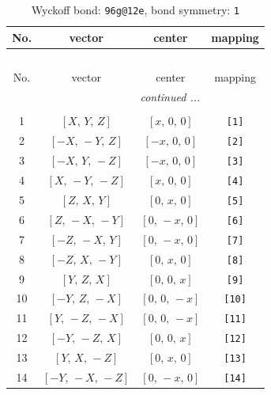 \documentclass[fleqn,8pt]{jsarticle}
\begin{document}
\begin{longtable}{cccc}
\caption{Wyckoff bond: {\tt 96g@12e}, bond symmetry: {\tt 1}}
 \\
 \hline \hline
No. & vector & center & mapping \\ \hline \endfirsthead

\multicolumn{3}{l}{\tablename\ \thetable{}} \\
 \hline \hline
No. & vector & center & mapping \\ \hline \endhead

 \hline \hline
\multicolumn{3}{r}{\footnotesize\it continued ...} \\ \endfoot

 \hline \hline
\multicolumn{3}{r}{} \\ \endlastfoot

1 & $\left[ X,\, Y,\, Z \right]$ & $\left[ x,\, 0,\, 0 \right]$ & {\tt [1]} \\ \hline
2 & $\left[ - X,\, - Y,\, Z \right]$ & $\left[ - x,\, 0,\, 0 \right]$ & {\tt [2]} \\ \hline
3 & $\left[ - X,\, Y,\, - Z \right]$ & $\left[ - x,\, 0,\, 0 \right]$ & {\tt [3]} \\ \hline
4 & $\left[ X,\, - Y,\, - Z \right]$ & $\left[ x,\, 0,\, 0 \right]$ & {\tt [4]} \\ \hline
5 & $\left[ Z,\, X,\, Y \right]$ & $\left[ 0,\, x,\, 0 \right]$ & {\tt [5]} \\ \hline
6 & $\left[ Z,\, - X,\, - Y \right]$ & $\left[ 0,\, - x,\, 0 \right]$ & {\tt [6]} \\ \hline
7 & $\left[ - Z,\, - X,\, Y \right]$ & $\left[ 0,\, - x,\, 0 \right]$ & {\tt [7]} \\ \hline
8 & $\left[ - Z,\, X,\, - Y \right]$ & $\left[ 0,\, x,\, 0 \right]$ & {\tt [8]} \\ \hline
9 & $\left[ Y,\, Z,\, X \right]$ & $\left[ 0,\, 0,\, x \right]$ & {\tt [9]} \\ \hline
10 & $\left[ - Y,\, Z,\, - X \right]$ & $\left[ 0,\, 0,\, - x \right]$ & {\tt [10]} \\ \hline
11 & $\left[ Y,\, - Z,\, - X \right]$ & $\left[ 0,\, 0,\, - x \right]$ & {\tt [11]} \\ \hline
12 & $\left[ - Y,\, - Z,\, X \right]$ & $\left[ 0,\, 0,\, x \right]$ & {\tt [12]} \\ \hline
13 & $\left[ Y,\, X,\, - Z \right]$ & $\left[ 0,\, x,\, 0 \right]$ & {\tt [13]} \\ \hline
14 & $\left[ - Y,\, - X,\, - Z \right]$ & $\left[ 0,\, - x,\, 0 \right]$ & {\tt [14]} \\ \hline

\end{longtable}
\end{document}
